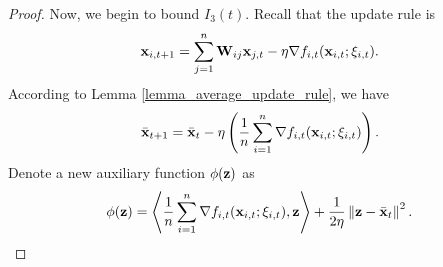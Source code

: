 \documentclass{article}
\begin{document}
\begin{proof}




Now, we begin to bound $I_3(t)$. Recall that the update rule is 
\begin{align}
\nonumber
{\bf x}_{i,t+1} = \sum_{j=1}^n {\bf W}_{ij}{\bf x}_{j,t} - \eta \nabla f_{i,t}({\bf x}_{i,t};\xi_{i,t}).
\end{align}  According to Lemma \ref{lemma_average_update_rule}, we have 
\begin{align}
\label{equa_thoerem_update_rule_equivalent}
\bar{{\bf x}}_{t+1} = \bar{{\bf x}}_t - \eta \left( \frac{1}{n}\sum_{i=1}^n \nabla f_{i,t}({\bf x}_{i,t};\xi_{i,t}) \right).
\end{align} 
Denote a new auxiliary function $\phi({\bf z})$ as 
\begin{align}
\nonumber
\phi({\bf z}) = \left\langle\frac{1}{n}\sum_{i=1}^n \nabla f_{i,t}({\bf x}_{i,t};\xi_{i,t}), {\bf z} \right\rangle + \frac{1}{2\eta}\left\lVert{\bf z} - \bar{{\bf x}}_t\right\rVert^2.
\end{align} 


\end{proof}
\end{document}

